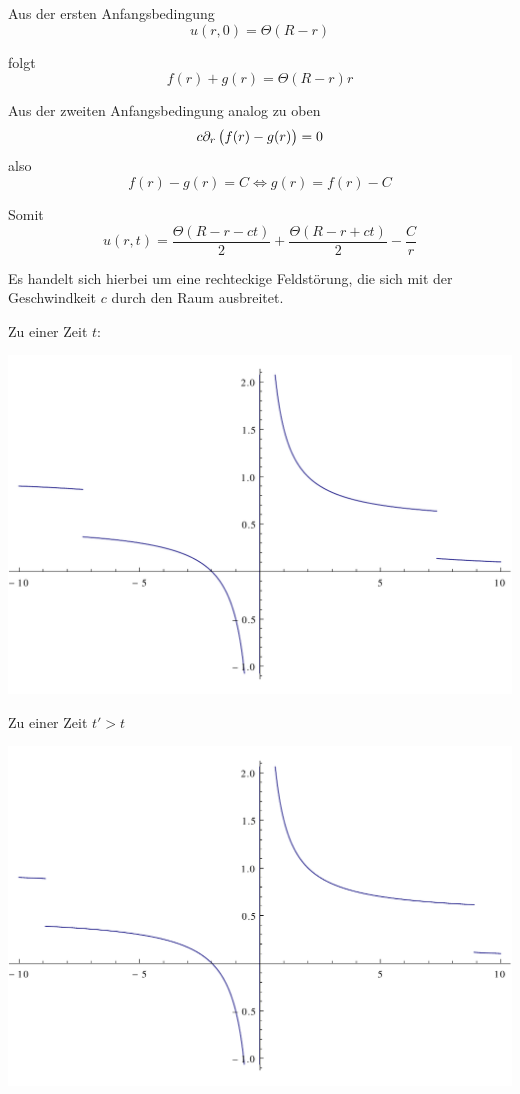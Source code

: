 \documentclass[a4paper,german,12pt,smallheadings]{scrartcl}
\begin{document}
Aus der ersten Anfangsbedingung
\begin{equation}
  u(r,0) = \Theta(R-r)
\end{equation}

folgt
\begin{equation}
  f(r) + g(r) = \Theta(R-r) r
\end{equation}

Aus der zweiten Anfangsbedingung analog zu oben
\begin{equation}
  c \partial_r \del{f(r) - g(r)} = 0
\end{equation}
also
\begin{equation}
  f(r) - g(r) = C \Leftrightarrow g(r) = f(r) - C
\end{equation}

Somit
\begin{equation}
  u(r,t) = \frac{\Theta(R - r - ct)}{2} + \frac{\Theta(R - r + ct)}{2} - \frac{C}{r}
\end{equation}

Es handelt sich hierbei um eine rechteckige Feldstörung, die sich mit der
Geschwindkeit $c$ durch den Raum ausbreitet.

\newpage
Zu einer Zeit $t$:

\includegraphics[width=\textwidth]{plot-stoerung.pdf}

Zu einer Zeit $t' > t$

\includegraphics[width=\textwidth]{plot-stoerung2.pdf}
\end{document}
